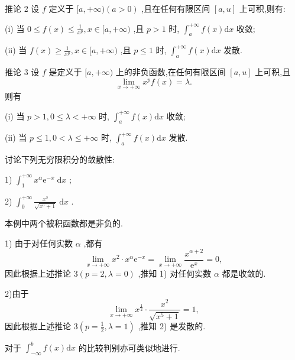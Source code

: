 推论 2 设 \(f\) 定义于 \(\lbrack a, + \infty )\left( {a > 0}\right)\) ,且在任何有限区间 \(\left\lbrack  {a,u}\right\rbrack\) 上可积,则有:

(i) 当 \(0 \leq  f\left( x\right)  \leq  \frac{1}{{x}^{p}},x \in  \lbrack a, + \infty )\) ,且 \(p > 1\) 时, \({\int }_{a}^{+\infty }f\left( x\right) \mathrm{d}x\) 收敛;

(ii) 当 \(f\left( x\right)  \geq  \frac{1}{{x}^{p}},x \in  \lbrack a, + \infty )\) ,且 \(p \leq  1\) 时, \({\int }_{a}^{+\infty }f\left( x\right) \mathrm{d}x\) 发散.

推论 3 设 \(f\) 是定义于 \(\lbrack a, + \infty )\) 上的非负函数,在任何有限区间 \(\left\lbrack  {a,u}\right\rbrack\) 上可积,且
\[
\mathop{\lim }\limits_{{x \rightarrow   + \infty }}{x}^{p}f\left( x\right)  = \lambda .
\]
则有

(i) 当 \(p > 1,0 \leq  \lambda  <  + \infty\) 时, \({\int }_{a}^{+\infty }f\left( x\right) \mathrm{d}x\) 收敛;

(ii) 当 \(p \leq  1,0 < \lambda  \leq   + \infty\) 时, \({\int }_{a}^{+\infty }f\left( x\right) \mathrm{d}x\) 发散.

\begin{example}

\end{example}
讨论下列无穷限积分的敛散性:

1) \({\int }_{1}^{+\infty }{x}^{\alpha }{\mathrm{e}}^{-x}\mathrm{\;d}x\) ;

2) \({\int }_{0}^{+\infty }\frac{{x}^{2}}{\sqrt{{x}^{5} + 1}}\mathrm{\;d}x\) .

\begin{solution}

\end{solution}
本例中两个被积函数都是非负的.

1) 由于对任何实数 \(\alpha\) ,都有
\[
\mathop{\lim }\limits_{{x \rightarrow   + \infty }}{x}^{2} \cdot  {x}^{\alpha }{\mathrm{e}}^{-x} = \mathop{\lim }\limits_{{x \rightarrow   + \infty }}\frac{{x}^{\alpha  + 2}}{{\mathrm{e}}^{x}} = 0,
\]
因此根据上述推论 \(3\left( {p = 2,\lambda  = 0}\right)\) ,推知 1) 对任何实数 \(\alpha\) 都是收敛的.

2)由于
\[
\mathop{\lim }\limits_{{x \rightarrow   + \infty }}{x}^{\frac{1}{2}} \cdot  \frac{{x}^{2}}{\sqrt{{x}^{5} + 1}} = 1,
\]
因此根据上述推论 \(3\left( {p = \frac{1}{2},\lambda  = 1}\right)\) ,推知 2) 是发散的.

对于 \({\int }_{-\infty }^{b}f\left( x\right) \mathrm{d}x\) 的比较判别亦可类似地进行.

